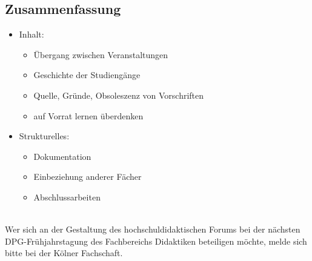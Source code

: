     \subsection*{Zusammenfassung}
      \begin{itemize}
        \item Inhalt:
          \begin{itemize}
            \item Übergang zwischen Veranstaltungen
            \item Geschichte der Studiengänge
            \item Quelle, Gründe, Obsoleszenz von Vorschriften
            \item auf Vorrat lernen überdenken
          \end{itemize}
        \item Strukturelles:
          \begin{itemize}
            \item Dokumentation
            \item Einbeziehung anderer Fächer
            \item Abschlussarbeiten
          \end{itemize}
      \end{itemize} \\
      Wer sich an der Gestaltung des hochschuldidaktischen Forums bei der nächsten DPG-Frühjahrstagung des Fachbereichs Didaktiken beteiligen möchte, melde sich bitte bei der Kölner Fachschaft.
